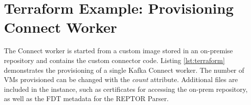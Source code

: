 \section{Terraform Example: Provisioning Connect Worker}
The Connect worker is started from a custom image stored in an on-premise repository and contains the custom connector code. Listing \ref{lst:terraform} demonstrates the provisioning of a single Kafka Connect worker. The number of \ac{VM}s provisioned can be changed with the \textit{count} attribute. Additional files are included in the instance, such as certificates for accessing the on-prem repository, as well as the \ac{FDT} metadata for the \ac{REPTOR} Parser.
